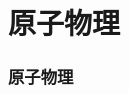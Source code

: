 \documentclass[../uem_phy_std_q.tex]{subfiles}
\begin{document}
\part{原子物理}

\section{原子物理}
\end{document}
